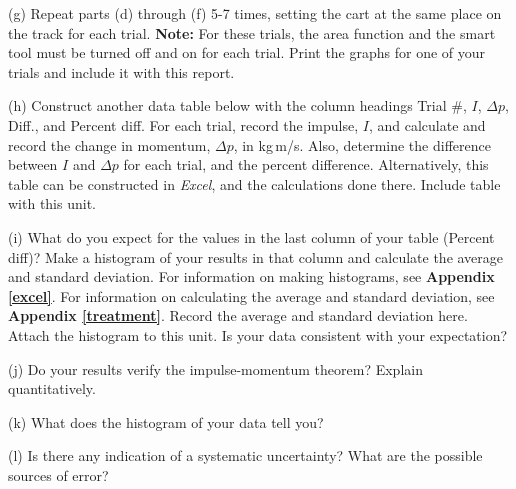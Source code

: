 (g) Repeat parts (d) through (f) 5-7 times, setting the cart at the same place on the track for each trial. \textbf{Note:} For these trials, the area function and the smart tool must be turned off and on for each trial. Print the graphs for one of your trials and include it with this report.

(h) Construct another data table below with the column headings
Trial \#, $I$, \( \Delta  p\), Diff., and Percent diff. For each trial, record
the impulse, $I$, and calculate and record the change in momentum, \( \Delta  p\), in kg\,m/s. Also, determine the difference between $I$ and $\Delta p$  for 
each trial, and the percent difference. Alternatively, this table can be constructed in \textit{Excel}, and the calculations done there. Include table with this unit.
\vspace{60mm}

(i) What do you expect for the values in the last column of your table (Percent diff)? Make a histogram of your results in that column and calculate the average and standard deviation. For information on making histograms, see \textbf{Appendix \ref{excel}}. For information on calculating the average and standard deviation, see \textbf{Appendix \ref{treatment}}. Record the average and standard 
deviation here. Attach the histogram to this unit. Is your data consistent with your expectation?
\vspace{15mm}

(j) Do your results verify the impulse-momentum theorem? Explain quantitatively.
\vspace{15mm}

(k) What does the histogram of your data tell you?
\vspace{15mm}

(l) Is there any indication of a systematic uncertainty? What are the possible
sources of error?

